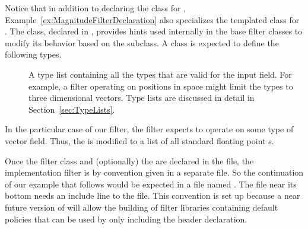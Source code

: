 

Notice that in addition to declaring the class for , Example~\ref{ex:MagnitudeFilterDeclaration} also specializes the  templated class for .
The  class, declared in , provides hints used internally in the base filter classes to modify its behavior based on the subclass.
A  class is expected to define the following types.
\begin{description}
\item[]
  A type list containing all the types that are valid for the input field.
  For example, a filter operating on positions in space might limit the types to three dimensional vectors.
  Type lists are discussed in detail in Section~\ref{sec:TypeLists}.
\end{description}

In the particular case of our  filter, the filter expects to operate on some type of vector field.
Thus, the  is modified to a list of all standard floating point s.


Once the filter class and (optionally) the  are declared in the  file, the implementation filter is by convention given in a separate  file.
So the continuation of our example that follows would be expected in a file named .
The  file near its bottom needs an include line to the  file.
This convention is set up because a near future version of \VTKm will allow the building of filter libraries containing default policies that can be used by only including the header declaration.

